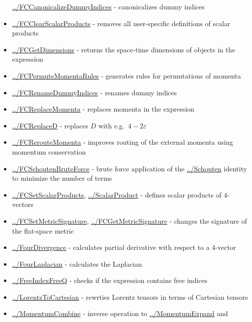 \documentclass[../FeynCalcManual.tex]{subfiles}
\begin{document}
\begin{itemize}
  \hyperlink{../fccanonicalizedummyindices}{../FCCanonicalizeDummyIndices}
  - canonicalizes dummy indices
\item
  \hyperlink{../fcclearscalarproducts}{../FCClearScalarProducts} -
  removes all user-specific definitions of scalar products
\item
  \hyperlink{../fcgetdimensions}{../FCGetDimensions} - returns the
  space-time dimensions of objects in the expression
\item
  \hyperlink{../fcpermutemomentarules}{../FCPermuteMomentaRules} -
  generates rules for permutations of momenta
\item
  \hyperlink{../fcrenamedummyindices}{../FCRenameDummyIndices} - renames
  dummy indices
\item
  \hyperlink{../fcreplacemomenta}{../FCReplaceMomenta} - replaces
  momenta in the expression
\item
  \hyperlink{../fcreplaced}{../FCReplaceD} - replaces \(D\) with
  e.g.~\(4-2 \varepsilon\)
\item
  \hyperlink{../fcreroutemomenta}{../FCRerouteMomenta} - improves
  routing of the external momenta using momentum conservation
\item
  \hyperlink{../fcschoutenbruteforce}{../FCSchoutenBruteForce} - brute
  force application of the \hyperlink{../schouten}{../Schouten} identity
  to minimize the number of terms
\item
  \hyperlink{../fcsetscalarproducts}{../FCSetScalarProducts},
  \hyperlink{../scalarproduct}{../ScalarProduct} - defines scalar
  products of \(4\)-vectors
\item
  \hyperlink{../fcsetmetricsignature}{../FCSetMetricSignature},
  \hyperlink{../fcgetmetricsignature}{../FCGetMetricSignature} - changes
  the signature of the flat-space metric
\item
  \hyperlink{../fourdivergence}{../FourDivergence} - calculates partial
  derivative with respect to a \(4\)-vector
\item
  \hyperlink{../fourlaplacian}{../FourLaplacian} - calculates the
  Laplacian
\item
  \hyperlink{../freeindexfreeq}{../FreeIndexFreeQ} - checks if the
  expression contains free indices
\item
  \hyperlink{../lorentztocartesian}{../LorentzToCartesian} - rewrties
  Lorentz tensors in terms of Cartesian tensors
\item
  \hyperlink{../momentumcombine}{../MomentumCombine} - inverse operation
  to \hyperlink{../momentumexpand}{../MomentumExpand} and

\end{itemize}
\end{document}
